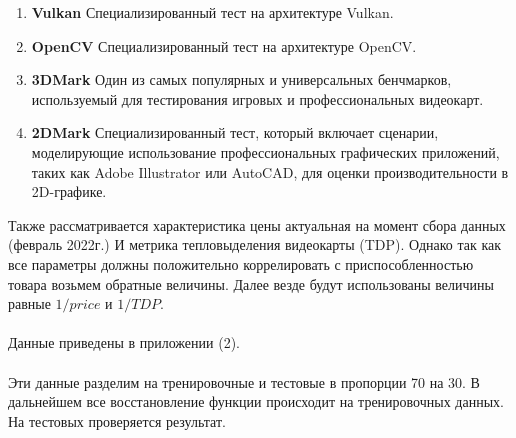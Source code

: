 \documentclass[14pt, a4paper]{extarticle}
\begin{document}
  \begin{enumerate}
    \item\textbf{Vulkan} Специализированный тест на архитектуре Vulkan.
    \item\textbf{OpenCV} Специализированный тест на архитектуре OpenCV.
    \item\textbf{3DMark} Один из самых популярных и универсальных бенчмарков, используемый для тестирования игровых и профессиональных видеокарт.
    \item\textbf{2DMark} Специализированный тест, который включает сценарии, моделирующие использование профессиональных графических приложений, таких как Adobe Illustrator или AutoCAD, для оценки производительности в 2D-графике.
  \end{enumerate}
  Также рассматривается характеристика цены актуальная на момент сбора данных (февраль 2022г.) И метрика тепловыделения видеокарты (TDP). Однако так как все параметры должны положительно коррелировать с приспособленностью товара возьмем обратные величины. Далее везде будут использованы величины равные \(1/price\) и \(1/TDP\).
  
  \paragraph{}
  Данные приведены в приложении (2).
  \paragraph{}
  Эти данные разделим на тренировочные и тестовые в пропорции 70 на 30. В дальнейшем все восстановление функции происходит на тренировочных данных. На тестовых проверяется результат.

  \newpage
\end{document}
